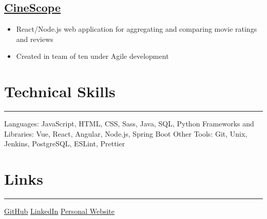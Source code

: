 \documentclass{article}
\begin{document}
\vspace{-1em}
\subsection{\href{https://github.com/WKhiro/CineScope-Client}{\color{NavyBlue}\underline{CineScope}}}
\begin{itemize}
	\itemsep0em
	\item React/Node.js web application for aggregating and comparing movie ratings and reviews
	\item Created in team of ten under Agile development
\end{itemize}

\vspace{-1em}
\section{Technical Skills}
\vspace{-1.5em}
\par\noindent\rule{\textwidth}{0.4pt}
Languages: JavaScript, HTML, CSS, Sass, Java, SQL, Python \newline
Frameworks and Libraries: Vue, React, Angular, Node.js, Spring Boot \newline
Other Tools: Git, Unix, Jenkins, PostgreSQL, ESLint, Prettier

\vspace{-0.5em}
\section{Links}
\vspace{-1.5em}	
\par\noindent\rule{\textwidth}{0.4pt}
{\faGithub} {\color{NavyBlue} \href{https://github.com/WKhiro}{\underline{GitHub}}} \space\space
{\color{LinkedInBlue}\faLinkedinSquare} {\color{NavyBlue} \href{https://www.linkedin.com/in/wesley-kok}{\underline{LinkedIn}}} \space\space
{\faFeed} {\color{NavyBlue} \href{https://wkhiro.github.io}{\underline{Personal Website}}}
\end{document}
